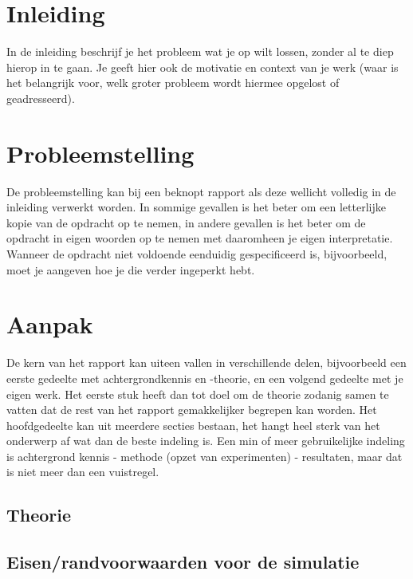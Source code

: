 \documentclass{report}
\begin{document}
\newcommand{\rp}{$\rightarrow$}
\newcommand{\Ohm}{$\Omega$}
\newcommand{\ohm}{$\omega$}
\newcommand{\gmu}{$\mu$}
\newcommand{\tss}{\textsubscript}
\newcommand{\lijst}{}




\chapter{Inleiding}
In de inleiding beschrijf je het probleem wat je op wilt lossen, zonder al te diep hierop in te gaan. Je
geeft hier ook de motivatie en context van je werk (waar is het belangrijk voor, welk groter probleem
wordt hiermee opgelost of geadresseerd).

\chapter{Probleemstelling}
De probleemstelling kan bij een beknopt rapport als deze wellicht volledig in de inleiding verwerkt
worden. In sommige gevallen is het beter om een letterlijke kopie van de opdracht op te nemen, in
andere gevallen is het beter om de opdracht in eigen woorden op te nemen met daaromheen je eigen
interpretatie. Wanneer de opdracht niet voldoende eenduidig gespeciﬁceerd is, bijvoorbeeld, moet je
aangeven hoe je die verder ingeperkt hebt.

\chapter{Aanpak}
De kern van het rapport kan uiteen vallen in verschillende delen, bijvoorbeeld een eerste gedeelte
met achtergrondkennis en -theorie, en een volgend gedeelte met je eigen werk. Het eerste stuk
heeft dan tot doel om de theorie zodanig samen te vatten dat de rest van het rapport gemakkelijker
begrepen kan worden. Het hoofdgedeelte kan uit meerdere secties bestaan, het hangt heel sterk van
het onderwerp af wat dan de beste indeling is. Een min of meer gebruikelijke indeling is achtergrond
kennis - methode (opzet van experimenten) - resultaten, maar dat is niet meer dan een vuistregel.



\section{Theorie}
\section{Eisen/randvoorwaarden voor de simulatie}
\end{document}
